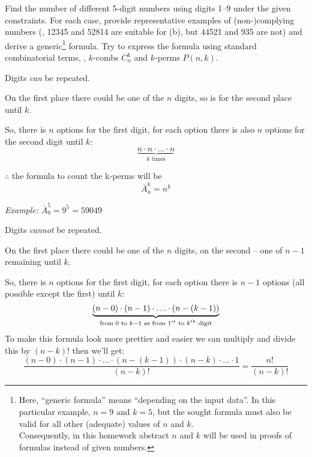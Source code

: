\documentclass[a4paper,12pt]{article}
\begin{document}
    
\begin{tasks}
    \item Find the number of different 5-digit numbers using digits 1–9 under the given constraints. For each case, provide representative examples of (non-)complying numbers (\eg, 12345 and 52814 are suitable for (b), but 44521 and 935 are not) and derive a generic\footnote{Here, \enquote{generic formula} means \enquote{depending on the input data}. In this particular example, $n = 9$ and $k = 5$, but the sought formula must also be valid for all other (adequate) values of $n$ and $k$.\\Consequently, in this homework abstract $n$ and $k$ will be used in proofs of formulas instead of given numbers.} formula. Try to express the formula using standard combinatorial terms, \eg, $k$-combs $C_n^k$ and $k$-perms $P(n, k)$.

    \begin{subtasks}
        \item Digits \emph{can} be repeated.
        
        \begin{subsubtasks}
            \item On the first place there could be one of the $n$ digits, so is for the second place \etc until $k$.
        
            \item So, there is $n$ options for the first digit, for each option there is also $n$ options for the second digit \etc until $k$: 
            $$\underbrace{n \cdot n \cdot \ldots \cdot n}_{k \text{ times}}$$

            \item  $\therefore$ the formula to count the k-perms will be 
            $$\overline{A}_n^k = n^k$$

            \item \emph{Example:} $\displaystyle\overline{A}_9^5 = 9^5 = 59049$
        \end{subsubtasks}

        \item Digits \emph{cannot} be repeated.
        
        \begin{subsubtasks}
            \item On the first place there could be one of the $n$ digits, on the second -- one of $n - 1$ remaining \etc until $k$.
            
            \item So, there is $n$ options for the first digit, for each option there is $n - 1$ options (all possible except the first) \etc until $k$:
            $$\underbrace{(n - 0) \cdot (n - 1) \cdot \ldots \cdot (n - (k - 1))}_{\text{from } 0 \text{ to } k - 1 \text{ as from } 1 \text{\textsuperscript{st} to } k \text{\textsuperscript{th} digit}}$$
            To make this formula look more prettier and easier we can multiply and divide this by $(n - k)!$ then we'll get:
            $$\frac{(n - 0) \cdot (n - 1) \cdot \ldots \cdot (n - (k - 1)) \cdot (n - k) \cdot \ldots \cdot 1}{(n - k)!} = \frac{n!}{(n - k)!}$$


\end{subsubtasks}
\end{subtasks}
\end{tasks}
\end{document}
